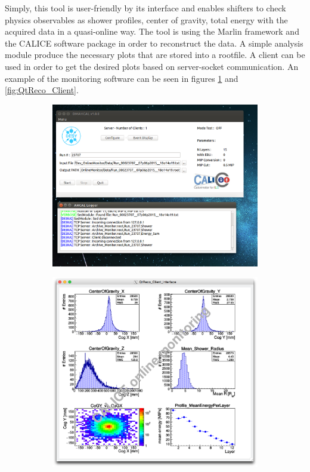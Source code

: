 Simply, this tool is user-friendly by its interface and enables shifters to check physics observables as shower profiles, center of gravity, total energy with the acquired data in a quasi-online way. The tool is using the Marlin framework and the CALICE software package in order to reconstruct the data. A simple analysis module produce the necessary plots that are stored into a rootfile. A client can be used in order to get the desired plots based on server-socket communication. An example of the monitoring software can be seen in figures \ref{fig:QtReco_Server} and \ref{fig:QtReco_Client}.

\begin{figure}[htbp!]
	\begin{subfigure}[t]{0.5\textwidth}
		\centering
		\includegraphics[width=1\linewidth]{chap5/fig_EnergyCalib/QtReco_Marlin.png}
		\caption{} \label{fig:QtReco_Server}
	\end{subfigure}
	\hfill
	\begin{subfigure}[t]{0.5\textwidth}
		\centering
		\includegraphics[width=1\linewidth]{chap5/fig_EnergyCalib/Shower_pion.png}

\end{subfigure}
\end{figure}
